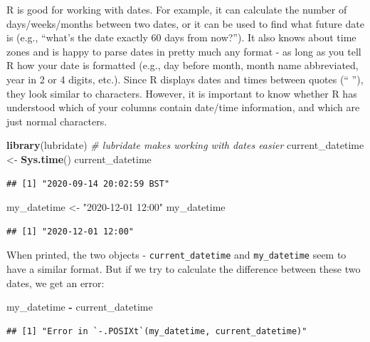 \documentclass[
  12pt,
  krantz2]{krantz}
\makeatletter
\newenvironment{Shaded}{\begin{snugshade}}{\end{snugshade}}
\newcommand{\CommentTok}[1]{\textcolor[rgb]{0.56,0.35,0.01}{\textit{#1}}}
\newcommand{\KeywordTok}[1]{\textcolor[rgb]{0.13,0.29,0.53}{\textbf{#1}}}
\newcommand{\NormalTok}[1]{#1}
\newcommand{\OperatorTok}[1]{\textcolor[rgb]{0.81,0.36,0.00}{\textbf{#1}}}
\newcommand{\StringTok}[1]{\textcolor[rgb]{0.31,0.60,0.02}{#1}}
\newenvironment{kframe}{%
\medskip{}
\setlength{\fboxsep}{.8em}
 \def\at@end@of@kframe{}%
 \ifinner\ifhmode%
  \def\at@end@of@kframe{\end{minipage}}%
  \begin{minipage}{\columnwidth}%
 \fi\fi%
 \def\FrameCommand##1{\hskip\@totalleftmargin \hskip-\fboxsep
 \colorbox{shadecolor}{##1}\hskip-\fboxsep
     \hskip-\linewidth \hskip-\@totalleftmargin \hskip\columnwidth}%
 \MakeFramed {\advance\hsize-\width
   \@totalleftmargin\z@ \linewidth\hsize
   \@setminipage}}%
 {\par\unskip\endMakeFramed%
 \at@end@of@kframe}
\renewenvironment{Shaded}{\begin{kframe}}{\end{kframe}}
\makeatother
\begin{document}
R is good for working with dates.
For example, it can calculate the number of days/weeks/months between two dates, or it can be used to find what future date is (e.g., ``what's the date exactly 60 days from now?'').
It also knows about time zones and is happy to parse dates in pretty much any format - as long as you tell R how your date is formatted (e.g., day before month, month name abbreviated, year in 2 or 4 digits, etc.).
Since R displays dates and times between quotes (`` ''), they look similar to characters.
However, it is important to know whether R has understood which of your columns contain date/time information, and which are just normal characters.

\begin{Shaded}
\begin{Highlighting}[]
\KeywordTok{library}\NormalTok{(lubridate) }\CommentTok{# lubridate makes working with dates easier}
\NormalTok{current_datetime <-}\StringTok{ }\KeywordTok{Sys.time}\NormalTok{()}
\NormalTok{current_datetime}
\end{Highlighting}
\end{Shaded}

\begin{verbatim}
## [1] "2020-09-14 20:02:59 BST"
\end{verbatim}

\begin{Shaded}
\begin{Highlighting}[]
\NormalTok{my_datetime <-}\StringTok{ "2020-12-01 12:00"}
\NormalTok{my_datetime}
\end{Highlighting}
\end{Shaded}

\begin{verbatim}
## [1] "2020-12-01 12:00"
\end{verbatim}

When printed, the two objects - \texttt{current\_datetime} and \texttt{my\_datetime} seem to have a similar format.
But if we try to calculate the difference between these two dates, we get an error:

\begin{Shaded}
\begin{Highlighting}[]
\NormalTok{my_datetime }\OperatorTok{-}\StringTok{ }\NormalTok{current_datetime}
\end{Highlighting}
\end{Shaded}

\begin{verbatim}
## [1] "Error in `-.POSIXt`(my_datetime, current_datetime)"
\end{verbatim}
\end{document}
